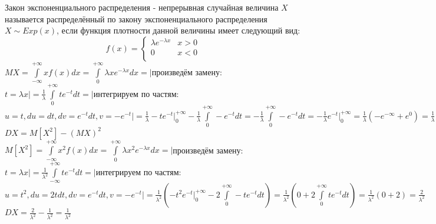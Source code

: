 Закон экспоненциального распределения - непрерывная случайная величина $X$ называется распределённый по закону экспоненциального распределения $X \sim Exp(x)$, если функция плотности данной величины имеет следующий вид:\\
\begin{equation}
f(x) = 
\begin{cases}
\lambda e^{-\lambda x} & x > 0\\
0 & x < 0\\
\end{cases}
\end{equation}
$MX = \int\limits_{-\infty}^{+\infty} x f(x) dx =  \int\limits_{0}^{+\infty} \lambda x e^{-\lambda x} dx = \bigg|$произведём замену: $ t = \lambda x \bigg| = \frac{1}{\lambda}\int\limits_{0}^{+\infty} t e^{-t} dt = \bigg|$интегрируем по частям: $ u = t, du = dt, dv = e^{-t} dt, v = -e^{-t}\bigg| = \frac{1}{\lambda} -t e^{-t}\bigg|_{0}^{+\infty} - \frac{1}{\lambda} \int\limits_{0}^{+\infty} -e^{-t} dt = - \frac{1}{\lambda} \int\limits_{0}^{+\infty} -e^{-t} dt = -\frac{1}{\lambda} e^{-t}\bigg|_{0}^{+\infty} = \frac{1}{\lambda}(-e^{-\infty} + e^{0}) = \frac{1}{\lambda}(0 + 1) = \frac{1}{\lambda}$\\
$DX = M[X^{2}] - (MX)^{2}$\\
$M[X^{2}] = \int\limits_{-\infty}^{+\infty} x^{2} f(x) dx = \int\limits_{0}^{+\infty} \lambda x^{2} e^{-\lambda x} dx = \bigg|$произведём замену: $ t = \lambda x \bigg| =  \frac{1}{\lambda^{2}} \int\limits_{-\infty}^{+\infty} t e^{-t} dt = \bigg|$интегрируем по частям: $ u = t^{2}, du = 2tdt, dv = e^{-t} dt, v = -e^{-t}\bigg| = \frac{1}{\lambda^{2}}(-t^{2} e^{-t}\bigg|_{0}^{+\infty} - 2 \int\limits_{0}^{+\infty} -t e^{-t} dt) = \frac{1}{\lambda^{2}}(0 + 2 \int\limits_{0}^{+\infty} t e^{-t} dt) = \frac{1}{\lambda^{2}}(0 + 2) = \frac{2}{\lambda^{2}}$\\
$DX = \frac{2}{\lambda^{2}} - \frac{1}{\lambda^{2}} = \frac{1}{\lambda^{2}}$\\

